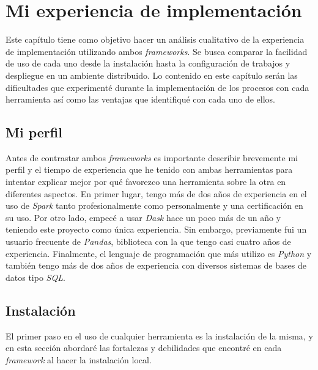 \chapter{Mi experiencia de implementación}

\noindent Este capítulo tiene como objetivo hacer un análisis cualitativo de la experiencia de implementación utilizando ambos \textit{frameworks}. Se busca comparar la facilidad de uso de cada uno desde la instalación hasta la configuración de trabajos y despliegue en un ambiente distribuido. Lo contenido en este capítulo serán las dificultades que experimenté durante la implementación de los procesos con cada herramienta así como las ventajas que identifiqué con cada uno de ellos.

\section{Mi perfil}

Antes de contrastar ambos \textit{frameworks} es importante describir brevemente mi perfil y el tiempo de experiencia que he tenido con ambas herramientas para intentar explicar mejor por qué favorezco una herramienta sobre la otra en diferentes aspectos. En primer lugar, tengo más de dos años de experiencia en el uso de \textit{Spark} tanto profesionalmente como personalmente y una certificación en su uso. Por otro lado, empecé a usar \textit{Dask} hace un poco más de un año y teniendo este proyecto como única experiencia. Sin embargo, previamente fui un usuario frecuente de \textit{Pandas}, biblioteca con la que tengo casi cuatro años de experiencia. Finalmente, el lenguaje de programación que más utilizo es \textit{Python} y también tengo más de dos años de experiencia con diversos sistemas de bases de datos tipo \textit{SQL}.

\section{Instalación}

El primer paso en el uso de cualquier herramienta es la instalación de la misma, y en esta sección abordaré las fortalezas y debilidades que encontré en cada \textit{framework} al hacer la instalación local.

